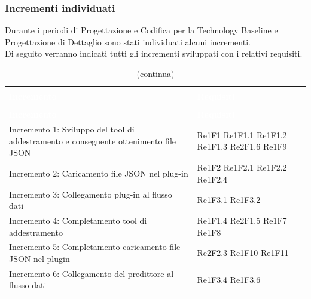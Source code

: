 \pagebreak
\subsubsection{Incrementi individuati}
Durante i periodi di Progettazione e Codifica per la Technology Baseline e Progettazione di Dettaglio sono stati individuati alcuni incrementi. \\
Di seguito verranno indicati tutti gli incrementi sviluppati con i relativi requisiti.

\begin{longtable}{C{4cm} L{3cm}}
\caption{Tracciamento incrementi} \\
\textcolor{white}{\textbf{Incremento}} &
\textcolor{white}{\textbf{Requisiti}} \\
		\endfirsthead
		\caption[]{(continua)} \\
\textcolor{white}{\textbf{Incremento}} &
\textcolor{white}{\textbf{Requisiti}} \\
		\endhead
Incremento 1: Sviluppo del tool di addestramento e conseguente ottenimento file JSON & Re1F1 \newline Re1F1.1  \newline Re1F1.2 \newline Re1F1.3 \newline Re2F1.6 \newline Re1F9 \\
Incremento 2: Caricamento file JSON	nel plug-in & Re1F2 \newline Re1F2.1 \newline Re1F2.2  \newline Re1F2.4\\
Incremento 3: Collegamento plug-in al flusso dati	& Re1F3.1 \newline Re1F3.2 \newline 
\\
Incremento 4: Completamento tool di addestramento & Re1F1.4 \newline Re2F1.5 \newline Re1F7 \newline Re1F8 
\\
Incremento 5: Completamento caricamento file JSON nel plugin & Re2F2.3 \newline Re1F10 \newline Re1F11
\\
Incremento 6: Collegamento del predittore al flusso dati & Re1F3.4 \newline Re1F3.6

\end{longtable}
